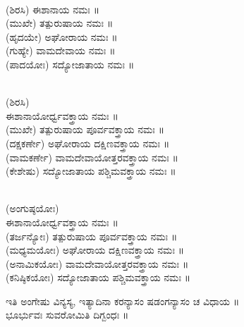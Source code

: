 \\
(ಶಿರಸಿ) ಈಶಾನಾಯ ನಮಃ ॥\\
(ಮುಖೇ) ತತ್ಪುರುಷಾಯ ನಮಃ ॥\\
(ಹೃದಯೇ) ಅಘೋರಾಯ ನಮಃ ॥\\
(ಗುಹ್ಯೇ) ವಾಮದೇವಾಯ ನಮಃ ॥\\
(ಪಾದಯೋಃ) ಸದ್ಯೋಜಾತಾಯ ನಮಃ ॥

\\
(ಶಿರಸಿ)\\ ಈಶಾನಾಯೋರ್ಧ್ವವಕ್ತ್ರಾಯ ನಮಃ ॥\\
(ಮುಖೇ) ತತ್ಪುರುಷಾಯ ಪೂರ್ವವಕ್ತ್ರಾಯ ನಮಃ ॥\\
(ದಕ್ಷಕರ್ಣೇ) ಅಘೋರಾಯ ದಕ್ಷಿಣವಕ್ತ್ರಾಯ ನಮಃ ॥\\
(ವಾಮಕರ್ಣೇ) ವಾಮದೇವಾಯೋತ್ತರವಕ್ತ್ರಾಯ ನಮಃ ॥\\
(ಕೇಶೇಷು) ಸದ್ಯೋಜಾತಾಯ ಪಶ್ಚಿಮವಕ್ತ್ರಾಯ ನಮಃ ॥

\\
(ಅಂಗುಷ್ಠಯೋಃ)\\ ಈಶಾನಾಯೋರ್ಧ್ವವಕ್ತ್ರಾಯ ನಮಃ ॥\\
(ತರ್ಜನ್ಯೋಃ) ತತ್ಪುರುಷಾಯ ಪೂರ್ವವಕ್ತ್ರಾಯ ನಮಃ ॥\\
(ಮಧ್ಯಮಯೋಃ) ಅಘೋರಾಯ ದಕ್ಷಿಣವಕ್ತ್ರಾಯ ನಮಃ ॥\\
(ಅನಾಮಿಕಯೋಃ) ವಾಮದೇವಾಯೋತ್ತರವಕ್ತ್ರಾಯ ನಮಃ ॥\\
(ಕನಿಷ್ಠಿಕಯೋಃ) ಸದ್ಯೋಜಾತಾಯ ಪಶ್ಚಿಮವಕ್ತ್ರಾಯ ನಮಃ ॥

ಇತಿ ಅಂಗೇಷು ವಿನ್ಯಸ್ಯ,  ಇತ್ಯಾದಿನಾ ಕರನ್ಯಾಸಂ ಷಡಂಗನ್ಯಾಸಂ ಚ ವಿಧಾಯ ॥\\
ಭೂರ್ಭುವಃ ಸುವರೋಮಿತಿ ದಿಗ್ಬಂಧಃ ॥
